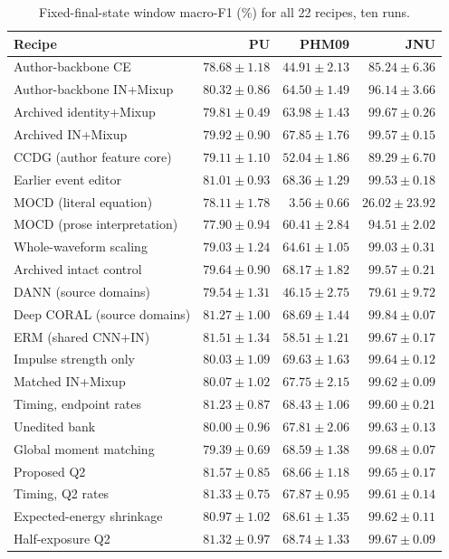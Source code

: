 \begin{table}[pos=htbp]
\centering\footnotesize
\caption{Fixed-final-state window macro-F1 (\%) for all 22 recipes, ten runs.}
\label{tab:all-last-macro_f1}
\begin{tabular}{lrrr}
\toprule
Recipe & PU & PHM09 & JNU\\
\midrule
Author-backbone CE & $78.68\pm1.18$ & $44.91\pm2.13$ & $85.24\pm6.36$\\
Author-backbone IN+Mixup & $80.32\pm0.86$ & $64.50\pm1.49$ & $96.14\pm3.66$\\
Archived identity+Mixup & $79.81\pm0.49$ & $63.98\pm1.43$ & $99.67\pm0.26$\\
Archived IN+Mixup & $79.92\pm0.90$ & $67.85\pm1.76$ & $99.57\pm0.15$\\
CCDG (author feature core) & $79.11\pm1.10$ & $52.04\pm1.86$ & $89.29\pm6.70$\\
Earlier event editor & $81.01\pm0.93$ & $68.36\pm1.29$ & $99.53\pm0.18$\\
MOCD (literal equation) & $78.11\pm1.78$ & $3.56\pm0.66$ & $26.02\pm23.92$\\
MOCD (prose interpretation) & $77.90\pm0.94$ & $60.41\pm2.84$ & $94.51\pm2.02$\\
Whole-waveform scaling & $79.03\pm1.24$ & $64.61\pm1.05$ & $99.03\pm0.31$\\
Archived intact control & $79.64\pm0.90$ & $68.17\pm1.82$ & $99.57\pm0.21$\\
DANN (source domains) & $79.54\pm1.31$ & $46.15\pm2.75$ & $79.61\pm9.72$\\
Deep CORAL (source domains) & $81.27\pm1.00$ & $68.69\pm1.44$ & $99.84\pm0.07$\\
ERM (shared CNN+IN) & $81.51\pm1.34$ & $58.51\pm1.21$ & $99.67\pm0.17$\\
Impulse strength only & $80.03\pm1.09$ & $69.63\pm1.63$ & $99.64\pm0.12$\\
Matched IN+Mixup & $80.07\pm1.02$ & $67.75\pm2.15$ & $99.62\pm0.09$\\
Timing, endpoint rates & $81.23\pm0.87$ & $68.43\pm1.06$ & $99.60\pm0.21$\\
Unedited bank & $80.00\pm0.96$ & $67.81\pm2.06$ & $99.63\pm0.13$\\
Global moment matching & $79.39\pm0.69$ & $68.59\pm1.38$ & $99.68\pm0.07$\\
Proposed Q2 & $81.57\pm0.85$ & $68.66\pm1.18$ & $99.65\pm0.17$\\
Timing, Q2 rates & $81.33\pm0.75$ & $67.87\pm0.95$ & $99.61\pm0.14$\\
Expected-energy shrinkage & $80.97\pm1.02$ & $68.61\pm1.35$ & $99.62\pm0.11$\\
Half-exposure Q2 & $81.32\pm0.97$ & $68.74\pm1.33$ & $99.67\pm0.09$\\
\bottomrule
\end{tabular}
\end{table}
